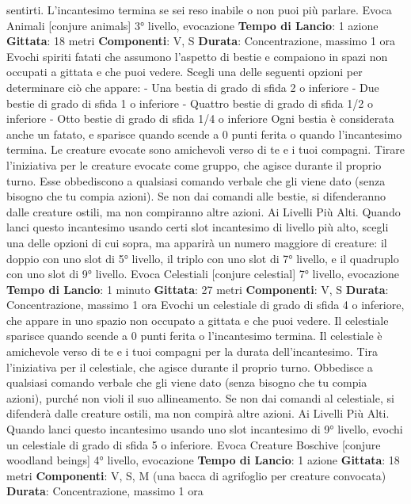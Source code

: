 \begin{multicols}{2}
sentirti. L’incantesimo termina se sei reso inabile o non
puoi più parlare.
Evoca Animali
[conjure animals]
3° livello, evocazione
\textbf{Tempo di Lancio}: 1 azione
\textbf{Gittata}: 18 metri
\textbf{Componenti}: V, S
\textbf{Durata}: Concentrazione, massimo 1 ora
Evochi spiriti fatati che assumono l’aspetto di bestie e
compaiono in spazi non occupati a gittata e che puoi
vedere. Scegli una delle seguenti opzioni per
determinare ciò che appare:
- Una bestia di grado di sfida 2 o inferiore
- Due bestie di grado di sfida 1 o inferiore
- Quattro bestie di grado di sfida 1/2 o inferiore
- Otto bestie di grado di sfida 1/4 o inferiore
Ogni bestia è considerata anche un fatato, e sparisce
quando scende a 0 punti ferita o quando l’incantesimo
termina.
Le creature evocate sono amichevoli verso di te e i tuoi
compagni. Tirare l’iniziativa per le creature evocate
come gruppo, che agisce durante il proprio turno. Esse
obbediscono a qualsiasi comando verbale che gli viene
dato (senza bisogno che tu compia azioni). Se non dai
comandi alle bestie, si difenderanno dalle creature
ostili, ma non compiranno altre azioni.
Ai Livelli Più Alti. Quando lanci questo incantesimo
usando certi slot incantesimo di livello più alto, scegli
una delle opzioni di cui sopra, ma apparirà un numero
maggiore di creature: il doppio con uno slot di 5° livello,
il triplo con uno slot di 7° livello, e il quadruplo con uno
slot di 9° livello.
Evoca Celestiali
[conjure celestial]
7° livello, evocazione
\textbf{Tempo di Lancio}: 1 minuto
\textbf{Gittata}: 27 metri
\textbf{Componenti}: V, S
\textbf{Durata}: Concentrazione, massimo 1 ora
Evochi un celestiale di grado di sfida 4 o inferiore, che
appare in uno spazio non occupato a gittata e che puoi
vedere. Il celestiale sparisce quando scende a 0 punti
ferita o l’incantesimo termina.
Il celestiale è amichevole verso di te e i tuoi compagni
per la durata dell’incantesimo. Tira l’iniziativa per il
celestiale, che agisce durante il proprio turno.
Obbedisce a qualsiasi comando verbale che gli viene
dato (senza bisogno che tu compia azioni), purché non
violi il suo allineamento. Se non dai comandi al
celestiale, si difenderà dalle creature ostili, ma non
compirà altre azioni.
Ai Livelli Più Alti. Quando lanci questo incantesimo
usando uno slot incantesimo di 9° livello, evochi un
celestiale di grado di sfida 5 o inferiore.
Evoca Creature Boschive
[conjure woodland beings]
4° livello, evocazione
\textbf{Tempo di Lancio}: 1 azione
\textbf{Gittata}: 18 metri
\textbf{Componenti}: V, S, M (una bacca di agrifoglio per
creature convocata)
\textbf{Durata}: Concentrazione, massimo 1 ora

\end{multicols}
